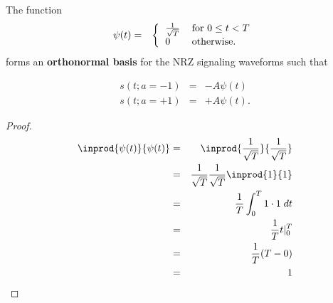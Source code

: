 \begin{proposition}
\label{prop:NRZ_basis}
The function
\begin{eqnarray*}
   \psi(t) 
     &=& \left\{
         \begin{tabular}{ll}
            $\frac{1}{\sqrt{T}}$ & for $0\le t < T$ \\
            $0$                  & otherwise.
         \end{tabular}
         \right.
\end{eqnarray*}
forms an {\bf orthonormal basis} for the NRZ signaling waveforms such that

\begin{eqnarray*}
   s(t;a=-1) &=& -A \psi(t)  \\
   s(t;a=+1) &=& +A \psi(t) .
\end{eqnarray*}

\end{proposition}

\begin{proof}
\begin{eqnarray*}
   \inprod{\psi(t)}{\psi(t)}
     &=& \inprod{\frac{1}{\sqrt{T}}} {\frac{1}{\sqrt{T}}}
   \\&=& \frac{1}{\sqrt{T}} \frac{1}{\sqrt{T}} \inprod{1}{1}
   \\&=& \frac{1}{T} \int_0^T 1\cdot1 \; dt
   \\&=& \frac{1}{T} t|_0^T
   \\&=& \frac{1}{T} (T-0)
    \\&=& 1
\end{eqnarray*}
\end{proof}




